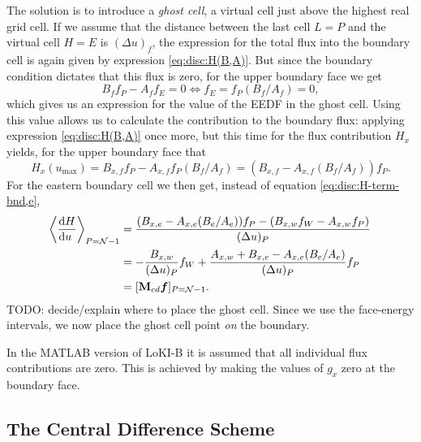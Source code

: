 \documentclass{book}
\newcommand{\MEAN}[1]{\ensuremath{\!\left\langle{{#1}}\right\rangle}}
\newcommand{\bvec}[1]{{\ensuremath{\bm {#1}}}}
\begin{document}
The solution is to introduce a {\em ghost cell}, a virtual cell just above the
highest real grid cell. If we assume that the distance between the last cell
$L=P$ and the virtual cell $H=E$ is $(\Delta u)_f$, the
expression for the total flux into the boundary cell is again given by expression
\eqref{eq:disc:H(B,A)}. But since the boundary condition dictates that
this flux is zero, for the upper boundary face we get
\begin{equation}
	B_ff_{P} - A_ff_{E} = 0
	\iff
	f_E = f_P (B_f/A_f) = 0,
\end{equation}
which gives us an expression for the value of the EEDF in the ghost cell.
Using this value allows us to calculate the contribution to the boundary flux:
applying expression \eqref{eq:disc:H(B,A)} once more, but this time for the
flux contribution $H_x$ yields, for the upper boundary face that
\begin{equation}
	H_x(u_{\text{max}})
	= B_{x,f}f_P - A_{x,f}f_P(B_f/A_f)
	= (B_{x,f} - A_{x,f}(B_f/A_f))f_P.
\end{equation}
For the eastern boundary cell we then get, instead of equation \eqref{eq:disc:H-term-bnd,e},
\begin{align}
	\MEAN{\DERIV{H}{u}}_{P={\cal N}-1}
	&= \frac{(B_{x,e} - A_{x,e}(B_e/A_e))f_P - (B_{x,w}f_W - A_{x,w}f_P)}{(\Delta u)_P}
	\nonumber \\
	&=  -\frac{B_{x,w}}{(\Delta u)_P}f_W + \frac{A_{x,w} + B_{x,e} - A_{x,e}(B_e/A_e)}{(\Delta u)_P}f_P
	\nonumber \\
	&= [\mat{M}_{cd}\bvec{f}]_{P={\cal N}-1}.
	\label{eq:disc:Hx-term-bnd,e}
\end{align}
TODO: decide/explain where to place the ghost cell. Since we use the face-energy intervals,
we now place the ghost cell point {\em on} the boundary.

\begin{framed}
In the MATLAB version of LoKI-B it is assumed that all individual flux contributions
are zero. This is achieved by making the values of $g_x$ zero at the boundary face.
\end{framed}


\subsection{The Central Difference Scheme}
\end{document}
